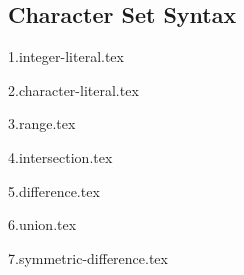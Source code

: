 
\subsection{Character Set Syntax}
{
	\lipsum[1]
	
	{1.integer-literal.tex}
	
	{2.character-literal.tex}
	
	{3.range.tex}
	
	{4.intersection.tex}
	
	{5.difference.tex}
	
	{6.union.tex}
	
	{7.symmetric-difference.tex}
}

